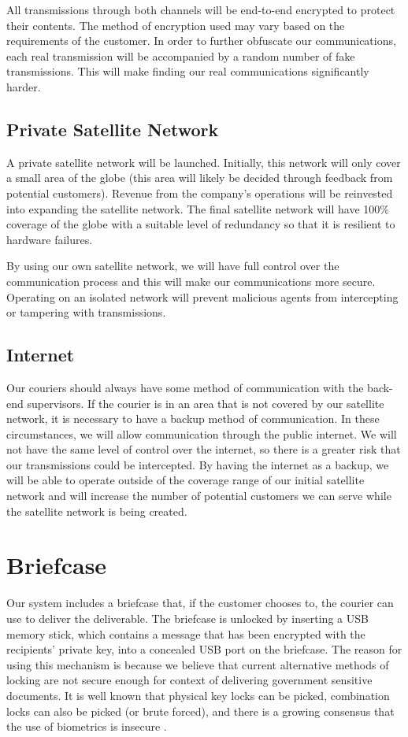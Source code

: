 All transmissions through both channels will be end-to-end encrypted to protect their contents. The method of encryption used may vary based on the requirements of the customer. In order to further obfuscate our communications, each real transmission will be accompanied by a random number of fake transmissions. This will make finding our real communications significantly harder.

\subsection{Private Satellite Network}
A private satellite network will be launched. Initially, this network will only cover a small area of the globe (this area will likely be decided through feedback from potential customers). Revenue from the company's operations will be reinvested into expanding the satellite network. The final satellite network will have 100\% coverage of the globe with a suitable level of redundancy so that it is resilient to hardware failures.

By using our own satellite network, we will have full control over the communication process and this will make our communications more secure. Operating on an isolated network will prevent malicious agents from intercepting or tampering with transmissions.

\subsection{Internet}
Our couriers should always have some method of communication with the back-end supervisors. If the courier is in an area that is not covered by our satellite network, it is necessary to have a backup method of communication. In these circumstances, we will allow communication through the public internet. We will not have the same level of control over the internet, so there is a greater risk that our transmissions could be intercepted. By having the internet as a backup, we will be able to operate outside of the coverage range of our initial satellite network and will increase the number of potential customers we can serve while the satellite network is being created.


\section{Briefcase} \label{briefcasearch}
Our system includes a briefcase that, if the customer chooses to, the courier can use to deliver the deliverable. The briefcase is unlocked by inserting a USB memory stick, which contains a message that has been encrypted with the recipients' private key, into a concealed USB port on the briefcase. The reason for using this mechanism is because we believe that current alternative methods of locking are not secure enough for context of delivering government sensitive documents. It is well known that physical key locks can be picked, combination locks can also be picked (or brute forced), and there is a growing consensus that the use of biometrics is insecure \cite{uludag2004biometric} \cite{aviraBiometric} \cite{betaBiometric}.

